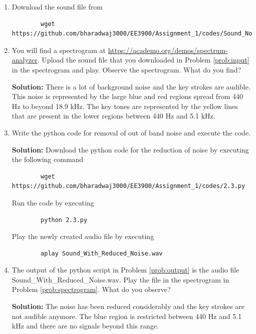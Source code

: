 \documentclass[journal,12pt,twocolumn]{IEEEtran}
\newcommand{\solution}{\noindent \textbf{Solution: }}
\numberwithin{equation}{section}
\renewcommand\thesection{\arabic{section}}
\begin{document}
	\begin{enumerate}[label=\thesection.\arabic*,ref=\thesection.\theenumi]
	\item \label{prob:input} Download the sound file from  
	\begin{lstlisting}
		wget https://github.com/bharadwaj3000/EE3900/Assignment_1/codes/Sound_Noise.wav
	\end{lstlisting}
	
	\item \label{prob:spectrogram} You will find a spectrogram at \href{https://academo.org/demos/spectrum-analyzer}{\url{https://academo.org/demos/spectrum-analyzer}}. Upload the sound file that you downloaded in Problem \ref{prob:input} in the spectrogram  and play.  Observe the spectrogram. What do you find?
	
	\solution There is a lot of background noise and the key strokes are audible. This noise is represented by the large blue and red regions spread from 440 Hz to beyond 18.9 kHz. The key tones are represented by the yellow lines that are present in the lower regions between 440 Hz and 5.1 kHz.
	
	\item \label{prob:output} Write the python code for removal of out of band noise and execute the code. 
	
	\solution Download the python code for the reduction of noise by executing the following command
	\begin{lstlisting}
		wget https://github.com/bharadwaj3000/EE3900/Assignment_1/codes/2.3.py
	\end{lstlisting}
	
	Run the code by executing
	\begin{lstlisting}
		python 2.3.py
	\end{lstlisting}
	
	Play the newly created audio file by executing
	\begin{lstlisting}
		aplay Sound_With_Reduced_Noise.wav
	\end{lstlisting}
	
	\item The output of the python script in Problem \ref{prob:output} is the audio file Sound\_With\_Reduced\_Noise.wav. Play the file in the spectrogram in Problem \ref{prob:spectrogram}. What do you observe?
	
	\solution The noise has been reduced considerably and the key strokes are not audible anymore. The blue region is restricted between 440 Hz and 5.1 kHz and there are no signals beyond this range.
	
	
	\end{enumerate}
	
\end{document}
